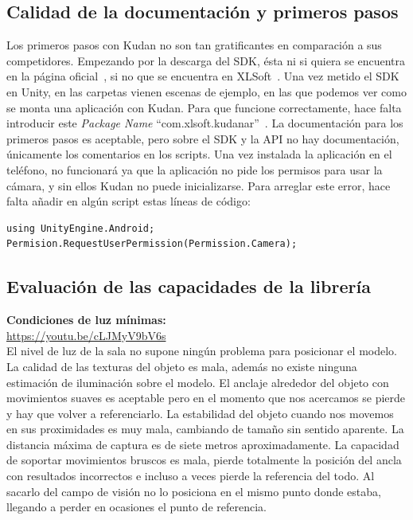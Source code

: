 \subsection{Calidad de la documentación y primeros pasos}
Los primeros pasos con Kudan no son tan gratificantes en comparación a sus competidores. Empezando por la descarga del SDK, ésta ni si quiera se encuentra en la página oficial~\cite{Kudan_Official}, si no que se encuentra en XLSoft~\cite{Kudan}. Una vez metido el SDK en Unity, en las carpetas vienen escenas de ejemplo, en las que podemos ver como se monta una aplicación con Kudan. Para que funcione correctamente, hace falta introducir este \textit{Package Name} ``com.xlsoft.kudanar''~\cite{Kudan_License}. La documentación para los primeros pasos es aceptable, pero sobre el SDK y la API no hay documentación, únicamente los comentarios en los scripts. Una vez instalada la aplicación en el teléfono, no funcionará ya que la aplicación no pide los permisos para usar la cámara, y sin ellos Kudan no puede inicializarse. Para arreglar este error, hace falta añadir en algún script estas líneas de código:\\
\begin{lstlisting}
using UnityEngine.Android;
Permision.RequestUserPermission(Permission.Camera);
\end{lstlisting}

\subsection{Evaluación de las capacidades de la librería}

\textbf{Condiciones de luz mínimas:}\\
\url{https://youtu.be/cLJMyV9bV6s}\\

El nivel de luz de la sala no supone ningún problema para posicionar el modelo. La calidad de las texturas del objeto es mala, además no existe ninguna estimación de iluminación sobre el modelo. El anclaje alrededor del objeto con movimientos suaves es aceptable pero en el momento que nos acercamos se pierde y hay que volver a referenciarlo. La estabilidad del objeto cuando nos movemos en sus proximidades es muy mala, cambiando de tamaño sin sentido aparente. La distancia máxima de captura es de siete metros aproximadamente. La capacidad de soportar movimientos bruscos es mala, pierde totalmente la posición del ancla con resultados incorrectos e incluso a veces pierde la referencia del todo. Al sacarlo del campo de visión no lo posiciona en el mismo punto donde estaba, llegando a perder en ocasiones el punto de referencia.\\

